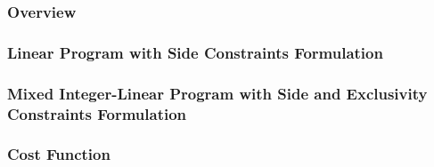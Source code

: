 \subsubsection{Overview}


\subsubsection{Linear Program with Side Constraints Formulation}\label{sec:GFCTP-LP}


\subsubsection{Mixed Integer-Linear Program with Side and Exclusivity Constraints Formulation}\label{sec:GFCTP-E}


\subsubsection{Cost Function}\label{sec:cost-function}


